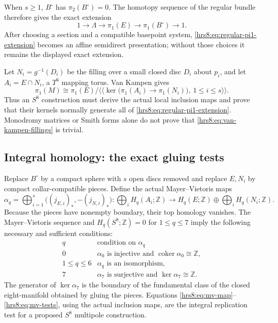 When $s\geq1$, $B^\circ$ has $\pi_2(B^\circ)=0$.  The homotopy sequence of
the regular bundle therefore gives the exact extension
\begin{equation}
 1\longrightarrow\Lambda\longrightarrow\pi_1(E)
 \longrightarrow\pi_1(B^\circ)\longrightarrow1.
 \label{hrs8:eq:regular-pi1-extension}
\end{equation}
After choosing a section and a compatible basepoint system,
\eqref{hrs8:eq:regular-pi1-extension} becomes an affine semidirect
presentation; without those choices it remains the displayed exact
extension.

Let $N_i=g^{-1}(D_i)$ be the filling over a small closed disc $D_i$ about
$p_i$, and let $A_i=E\cap N_i$, a $T^6$ mapping torus.  Van Kampen gives
\begin{equation}
 \pi_1(M)\cong
 \pi_1(E)\Big/
 \Big\langle\!\Big\langle
  \ker\bigl(\pi_1(A_i)\to\pi_1(N_i)\bigr),\ 1\leq i\leq s
 \Big\rangle\!\Big\rangle.
 \label{hrs8:eq:van-kampen-fillings}
\end{equation}
Thus an $S^8$ construction must derive the actual local inclusion maps and
prove that their kernels normally generate all of
\eqref{hrs8:eq:regular-pi1-extension}.  Monodromy matrices or Smith forms
alone do not prove that \eqref{hrs8:eq:van-kampen-fillings} is trivial.

\subsection{Integral homology: the exact gluing tests}
\label{hrs8:subsec:homology}

Replace $B^\circ$ by a compact sphere with $s$ open discs removed and replace
$E,N_i$ by compact collar-compatible pieces.  Define the actual
Mayer--Vietoris maps
\begin{equation}
 \alpha_q=
 \bigoplus_{i=1}^s\bigl((j_{E,i})_*,-(j_{N,i})_*\bigr)\colon
 \bigoplus_iH_q(A_i;\mathbb Z)\longrightarrow
 H_q(E;\mathbb Z)\oplus\bigoplus_iH_q(N_i;\mathbb Z).
 \label{hrs8:eq:mv-map}
\end{equation}
Because the pieces have nonempty boundary, their top homology vanishes.  The
Mayer--Vietoris sequence and
$H_q(S^8;\mathbb Z)=0$ for $1\leq q\leq7$ imply the following necessary and
sufficient conditions:
\begin{equation}
\begin{array}{c|l}
q&\text{condition on }\alpha_q\\ \hline
0&\alpha_0\text{ is injective and }\operatorname{coker}\alpha_0\cong\mathbb Z,\\
1\leq q\leq6&\alpha_q\text{ is an isomorphism},\\
7&\alpha_7\text{ is surjective and }\ker\alpha_7\cong\mathbb Z.
\end{array}
\label{hrs8:eq:mv-tests}
\end{equation}
The generator of $\ker\alpha_7$ is the boundary of the fundamental class of
the closed eight-manifold obtained by gluing the pieces.  Equations
\eqref{hrs8:eq:mv-map}--\eqref{hrs8:eq:mv-tests}, using the actual inclusion
maps, are the integral replication test for a proposed $S^8$ multipole
construction.

